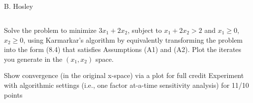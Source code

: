 \documentclass[12pt]{amsart}
\begin{document}
\raggedbottom

\hspace{\fill} {\large B. Hosley}
\bigskip


\setcounter{section}{8}
\setcounter{subsection}{0}
\subsection{}
Solve the problem to minimize  \(3x_1 + 2x_2\), subject to \(x_1 + 2x_2 > 2\) and \(x_1 \geq 0\), 
\(x_2 \geq 0\), using Karmarkar's algorithm by equivalently transforming the problem into 
the form (8.4) that satisfies Assumptions (A1) and (A2). Plot the iterates you 
generate in the \(( x_1 ,x_2 )\) space.




Show convergence (in the original x-space) via a plot for full credit
Experiment with algorithmic settings (i.e., one factor at-a-time sensitivity analysis) for 11/10 points
\end{document}
